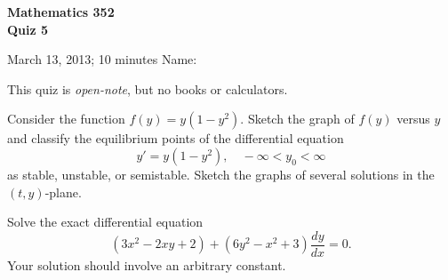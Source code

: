 \documentclass[11pt]{exam}
\begin{document}
\noindent
\textbf{{\large Mathematics 352 \\ Quiz 5}}

\noindent
March 13, 2013; 10 minutes  \hfill Name: \underline{\hspace{3in}} 

\noindent
This quiz is \emph{open-note}, but no books or calculators.

\begin{questions}  

\question Consider the function $f(y) = y(1-y^2)$. Sketch the graph of $f(y)$ versus $y$ and classify the equilibrium points of the differential equation
\[
    y' = y(1-y^2), \quad -\infty < y_0 < \infty
\]
as stable, unstable, or semistable. Sketch the graphs of several solutions in the $(t,y)$-plane.


\question Solve the exact differential equation
\[
    (3x^2 - 2xy + 2) + (6y^2 - x^2 + 3) \frac{dy}{dx} = 0.
\]
Your solution should involve an arbitrary constant.


\end{questions}
\end{document}
